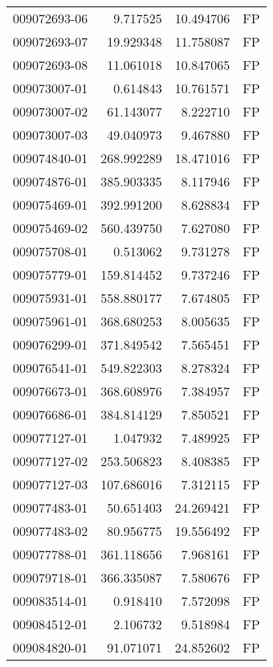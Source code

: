 \begin{tabular}{lrrl}
009072693-06 &    9.717525 &      10.494706 &   FP \\
009072693-07 &   19.929348 &      11.758087 &   FP \\
009072693-08 &   11.061018 &      10.847065 &   FP \\
009073007-01 &    0.614843 &      10.761571 &   FP \\
009073007-02 &   61.143077 &       8.222710 &   FP \\
009073007-03 &   49.040973 &       9.467880 &   FP \\
009074840-01 &  268.992289 &      18.471016 &   FP \\
009074876-01 &  385.903335 &       8.117946 &   FP \\
009075469-01 &  392.991200 &       8.628834 &   FP \\
009075469-02 &  560.439750 &       7.627080 &   FP \\
009075708-01 &    0.513062 &       9.731278 &   FP \\
009075779-01 &  159.814452 &       9.737246 &   FP \\
009075931-01 &  558.880177 &       7.674805 &   FP \\
009075961-01 &  368.680253 &       8.005635 &   FP \\
009076299-01 &  371.849542 &       7.565451 &   FP \\
009076541-01 &  549.822303 &       8.278324 &   FP \\
009076673-01 &  368.608976 &       7.384957 &   FP \\
009076686-01 &  384.814129 &       7.850521 &   FP \\
009077127-01 &    1.047932 &       7.489925 &   FP \\
009077127-02 &  253.506823 &       8.408385 &   FP \\
009077127-03 &  107.686016 &       7.312115 &   FP \\
009077483-01 &   50.651403 &      24.269421 &   FP \\
009077483-02 &   80.956775 &      19.556492 &   FP \\
009077788-01 &  361.118656 &       7.968161 &   FP \\
009079718-01 &  366.335087 &       7.580676 &   FP \\
009083514-01 &    0.918410 &       7.572098 &   FP \\
009084512-01 &    2.106732 &       9.518984 &   FP \\
009084820-01 &   91.071071 &      24.852602 &   FP \\

\end{tabular}
